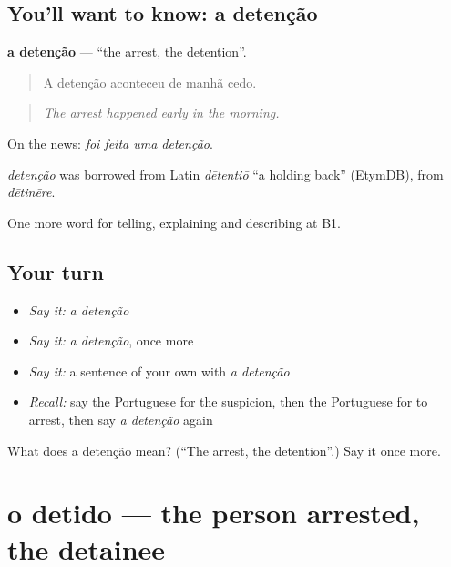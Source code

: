\subsection*{You'll want to know: a detenção}
\textbf{a detenção} — \textquotedblleft{}the arrest, the detention\textquotedblright{}.

\begin{quote}
A detenção aconteceu de manhã cedo.
\end{quote}

\begin{quote}
\emph{The arrest happened early in the morning.}
\end{quote}

On the news: \emph{foi feita uma detenção}.

\begin{cousinweb}
\emph{detenção} was borrowed from Latin \emph{dētentiō} \textquotedblleft{}a holding back\textquotedblright{} (EtymDB), from \emph{dētinēre}.
\end{cousinweb}

\begin{grammarlens}[title={What you've built}]
One more word for telling, explaining and describing at B1.
\end{grammarlens}

\subsection*{Your turn}
\begin{itemize}
\raggedright
  \item \emph{Say it:} \emph{a detenção}
  \item \emph{Say it:} \emph{a detenção}, once more
  \item \emph{Say it:} a sentence of your own with \emph{a detenção}
  \item \emph{Recall:} say the Portuguese for the suspicion, then the Portuguese for to arrest, then say \emph{a detenção} again
\end{itemize}

\begin{tcolorbox}[breakable,colback=teal!4,colframe=teal!35!black,title={Before you move on}]
What does a detenção mean? (\textquotedblleft{}The arrest, the detention\textquotedblright{}.) Say it once more.
\end{tcolorbox}
\section[o detido]{o detido — the person arrested, the detainee}


